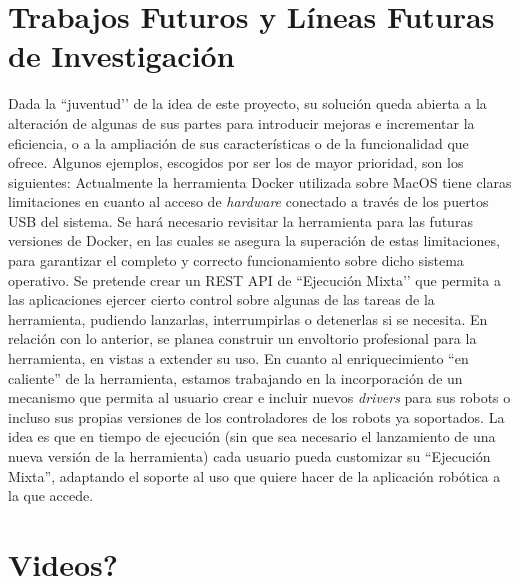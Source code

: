 \section{Trabajos Futuros y Líneas Futuras de Investigación }
Dada la ``juventud’’ de la idea de este proyecto, su solución queda abierta a la alteración de algunas de sus partes para introducir mejoras e incrementar la eficiencia, o a la ampliación de sus características o de la funcionalidad que ofrece. Algunos ejemplos, escogidos por ser los de mayor prioridad, son los siguientes:
Actualmente la herramienta Docker utilizada sobre MacOS tiene claras limitaciones en cuanto al acceso de \textit{hardware} conectado a través de los puertos USB del sistema. Se hará necesario revisitar la herramienta para las futuras versiones de Docker, en las cuales se asegura la superación de estas limitaciones, para garantizar el completo y correcto funcionamiento sobre dicho sistema operativo.
Se pretende crear un REST API de ``Ejecución Mixta’’ que permita a las aplicaciones ejercer cierto control sobre algunas de las tareas de la herramienta, pudiendo lanzarlas, interrumpirlas o detenerlas si se necesita.
En relación con lo anterior, se planea construir un envoltorio profesional para la herramienta, en vistas a extender su uso.
En cuanto al enriquecimiento ``en caliente'' de la herramienta, estamos trabajando en la incorporación de un mecanismo que permita al usuario crear e incluir nuevos \textit{drivers} para sus robots o incluso sus propias versiones de los controladores de los robots ya soportados. La idea es que en tiempo de ejecución (sin que sea necesario el lanzamiento de una nueva versión de la herramienta) cada usuario pueda customizar su ``Ejecución Mixta'', adaptando el soporte al uso que quiere hacer de la aplicación robótica a la que accede.

\section{Videos?}
